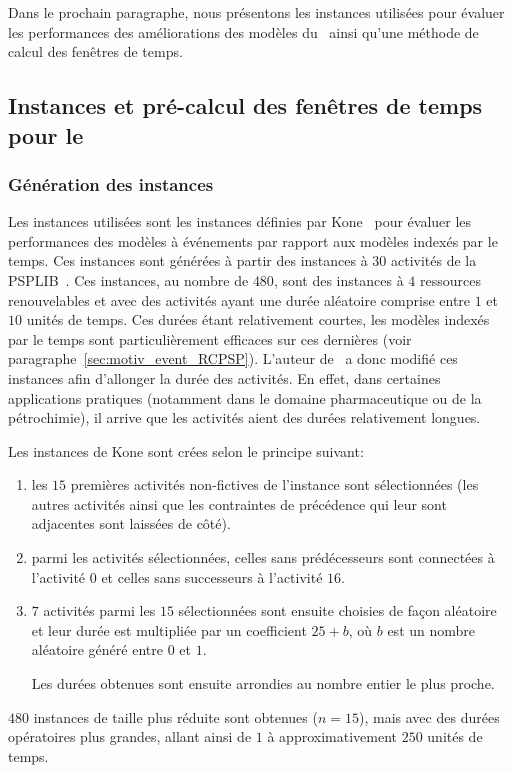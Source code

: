 Dans le prochain paragraphe, nous présentons les instances utilisées
pour évaluer les performances des améliorations des modèles du
\RCPSP~ainsi qu'une méthode de calcul des fenêtres de temps.
  
\subsection{Instances et pré-calcul des fenêtres de temps pour le
  \RCPSP}
\label{sec:instances_RCPSP}
\subsubsection{Génération des instances}
Les instances utilisées sont les instances définies par
Kone~\cite{theseOumar} pour évaluer les performances des modèles à
événements par rapport aux modèles indexés par le temps. Ces instances
sont générées à partir des instances à $30$ activités de la
PSPLIB~\cite{PSPLIB}. Ces instances, au nombre de $480$, sont des
instances à $4$ ressources renouvelables et avec des activités ayant
une durée aléatoire comprise entre $1$ et $10$ unités de temps. Ces
durées étant relativement courtes, les modèles indexés par le temps
sont particulièrement efficaces sur ces dernières (voir
paragraphe~\ref{sec:motiv_event_RCPSP}). L'auteur de~\cite{theseOumar}
a donc modifié ces instances afin d'allonger la durée des
activités. En effet, dans certaines applications pratiques (notamment
dans le domaine pharmaceutique ou de la pétrochimie), il arrive que
les activités aient des durées relativement longues.

Les instances de Kone sont crées selon le principe suivant: 
\begin{enumerate}
\item les $15$ premières activités non-fictives de l’instance sont
  sélectionnées (les autres activités ainsi que les contraintes de
  précédence qui leur sont adjacentes sont laissées de côté).
\item parmi les activités sélectionnées, celles sans prédécesseurs
  sont connectées à l’activité 0 et celles sans successeurs à l’activité
  $16$.
\item  $7$ activités parmi les $15$ sélectionnées sont ensuite
  choisies de façon aléatoire et leur durée est multipliée par un
  coefficient $25+b$, où $b$ est un nombre aléatoire généré entre $0$
  et  $1$.

  Les durées obtenues sont ensuite arrondies au nombre entier le plus
  proche. 
\end{enumerate}
$480$ instances de taille plus réduite sont obtenues ($n=15$), mais
avec des durées opératoires plus grandes, allant ainsi de $1$ à
approximativement $250$ unités de temps. 

